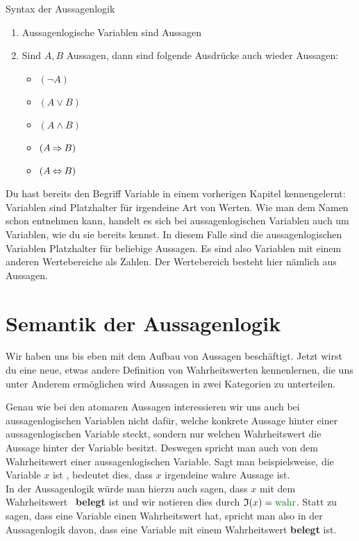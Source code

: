 \documentclass[../../main.tex]{subfiles}
\begin{document}
    \begin{definition}{Syntax der Aussagenlogik}
        \begin{enumerate}
            \item Aussagenlogische Variablen sind Aussagen 
            \item Sind $A,B$ Aussagen, dann sind folgende Ausdrücke auch wieder Aussagen:
                \begin{itemize}
                    \item $(\lnot A)$
                    \item $(A \lor B)$
                    \item $(A \land B)$
                    \item $(A \mathbin{\Rightarrow} B)$
                    \item $(A \mathbin{\Leftrightarrow} B)$
                \end{itemize}
        \end{enumerate}
    \end{definition}

    Du hast bereits den Begriff Variable in einem vorherigen Kapitel kennengelernt: Variablen sind 
    Platzhalter für irgendeine Art von Werten. Wie man dem Namen schon entnehmen 
    kann, handelt es sich bei aussagenlogischen Variablen auch um Variablen, wie 
    du sie bereits kennst. In diesem Falle sind die aussagenlogischen Variablen 
    Platzhalter für beliebige Aussagen. Es sind also Variablen mit einem anderen 
    Wertebereiche als Zahlen. Der Wertebereich besteht hier nämlich aus Aussagen.

    \section*{Semantik der Aussagenlogik}
    Wir haben uns bis eben mit dem Aufbau von Aussagen beschäftigt. 
    Jetzt wirst du eine neue, etwas andere Definition von Wahrheitswerten 
    kennenlernen, die uns unter Anderem ermöglichen wird Aussagen in zwei Kategorien zu unterteilen.


    Genau wie bei den atomaren Aussagen interessieren wir uns auch bei 
    aussagenlogischen Variablen 
    nicht dafür, welche 
    konkrete Aussage hinter einer aussagenlogischen Variable steckt, 
    sondern nur welchen Wahrheitswert die Aussage hinter der Variable besitzt. 
    Deswegen spricht man auch von dem Wahrheitswert einer 
    aussagenlogischen Variable.
    Sagt man beispielsweise, die Variable $x$ ist \wahr, bedeutet dies, 
    dass $x$ irgendeine wahre Aussage ist. \\
    In der Aussagenlogik würde man hierzu auch sagen, dass 
    $x$ mit dem Wahrheitswert \wahr\ \textbf{belegt} ist und wir notieren 
    dies durch $\mathfrak{I}(x) = \wahr$. 
    Statt zu sagen, dass eine Variable einen Wahrheitswert hat, spricht 
    man also in der Aussagenlogik davon, dass eine Variable mit einem Wahrheitswert 
    \textbf{belegt} ist. 
\end{document}
